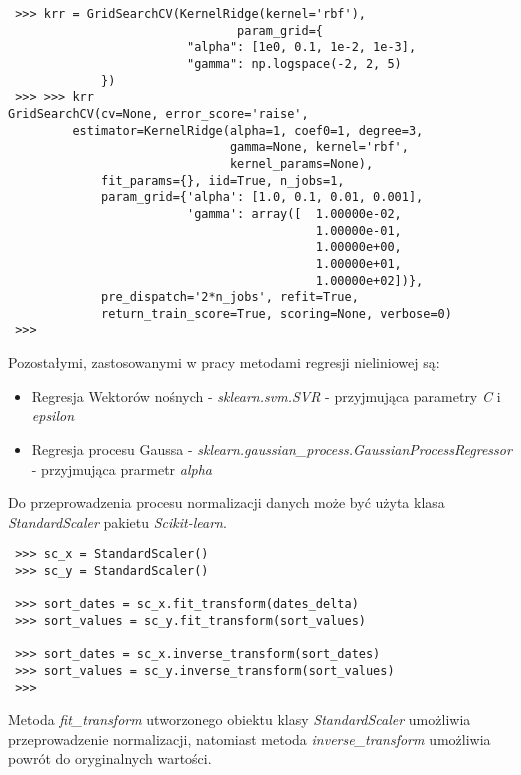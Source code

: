 \begin{lstlisting}
 >>> krr = GridSearchCV(KernelRidge(kernel='rbf'),
                                param_grid={
                         "alpha": [1e0, 0.1, 1e-2, 1e-3],
                         "gamma": np.logspace(-2, 2, 5)
			 })
 >>> >>> krr
GridSearchCV(cv=None, error_score='raise',
	     estimator=KernelRidge(alpha=1, coef0=1, degree=3,
	                           gamma=None, kernel='rbf',
	                           kernel_params=None),
             fit_params={}, iid=True, n_jobs=1,
             param_grid={'alpha': [1.0, 0.1, 0.01, 0.001], 
                         'gamma': array([  1.00000e-02,
                                           1.00000e-01,
                                           1.00000e+00,
                                           1.00000e+01,
                                           1.00000e+02])},
             pre_dispatch='2*n_jobs', refit=True,
             return_train_score=True, scoring=None, verbose=0)
 >>>             
\end{lstlisting}

Pozostałymi, zastosowanymi w pracy metodami regresji nieliniowej są:
\begin{itemize}
 \item Regresja Wektorów nośnych - \textit{sklearn.svm.SVR} - przyjmująca parametry \textit{C} i \textit{epsilon}
 \item Regresja procesu Gaussa - \textit{sklearn.gaussian\_process.GaussianProcessRegressor} - przyjmująca prarmetr \textit{alpha}\\
\end{itemize}

Do przeprowadzenia procesu normalizacji danych może być użyta klasa \textit{StandardScaler} pakietu \textit{Scikit-learn}. 
\begin{lstlisting}
 >>> sc_x = StandardScaler()
 >>> sc_y = StandardScaler()

 >>> sort_dates = sc_x.fit_transform(dates_delta)
 >>> sort_values = sc_y.fit_transform(sort_values)
 
 >>> sort_dates = sc_x.inverse_transform(sort_dates)
 >>> sort_values = sc_y.inverse_transform(sort_values)
 >>>
\end{lstlisting}

Metoda \textit{fit\_transform} utworzonego obiektu klasy \textit{StandardScaler} umożliwia przeprowadzenie normalizacji, natomiast metoda \textit{inverse\_transform} umożliwia powrót do oryginalnych wartości.



